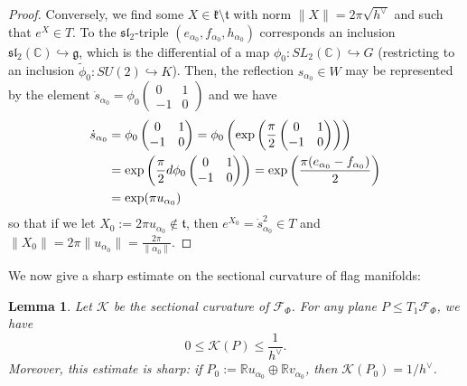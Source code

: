 \documentclass[11pt,twoside]{amsart}
\theoremstyle{plain}
\newtheorem{lem}[prop]{Lemma}
\newcommand{\C}{{\mathbb C}}
\newcommand{\R}{{\mathbb R}}
\begin{document}
\begin{proof}
Conversely, we find some $X\in\mathfrak{k}\setminus\mathfrak{t}$ with norm $\|X\|=2\pi\sqrt{h^\vee}$ and such that $e^X\in T$. To the $\mathfrak{sl}_2$-triple $(e_{\alpha_0},f_{\alpha_0},h_{\alpha_0})$ corresponds an inclusion $\mathfrak{sl}_2(\C)\hookrightarrow\mathfrak{g}$, which is the differential of a map $\phi_0 : SL_2(\C)\hookrightarrow G$ (restricting to an inclusion $\widetilde{\phi}_0 : SU(2)\hookrightarrow K$). Then, the reflection $s_{\alpha_0}\in W$ may be represented by the element $\dot{s}_{\alpha_0}=\phi_0\left(\begin{smallmatrix}0 & 1 \\ -1 & 0\end{smallmatrix}\right)$ and we have
\begin{align*}
\dot{s}_{\alpha_0}&=\phi_0\begin{pmatrix}0 & 1 \\ -1 & 0\end{pmatrix}=\phi_0\left(\exp\left(\frac{\pi}{2}\begin{pmatrix}0 & 1 \\ -1 & 0\end{pmatrix}\right)\right) \\
&=\exp\left(\frac{\pi}{2}{\rm d}\phi_0\begin{pmatrix}0 & 1 \\ -1 & 0\end{pmatrix}\right)=\exp\left(\frac{\pi(e_{\alpha_0}-f_{\alpha_0})}{2}\right) \\
&=\exp(\pi u_{\alpha_0})
\end{align*}
so that if we let $X_0:=2\pi u_{\alpha_0}\notin\mathfrak{t}$, then $e^{X_0}=\dot{s}^2_{\alpha_0}\in T$ and $\|X_0\|=2\pi\|u_{\alpha_0}\|=\frac{2\pi}{\|\alpha_0\|}$.%
\end{proof}

We now give a sharp estimate on the sectional curvature of flag manifolds:
\begin{lem}\label{curvat}
Let $\mathcal{K}$ be the sectional curvature of $\mathcal{F}_\Phi$. For any plane $P\le T_1\mathcal{F}_\Phi$, we have
\[0\le\mathcal{K}(P)\le\frac{1}{h^\vee}.\]
Moreover, this estimate is sharp: if $P_0:=\R u_{\alpha_0}\oplus\R v_{\alpha_0}$, then $\mathcal{K}(P_0)=1/h^\vee$.
\end{lem}
\end{document}
